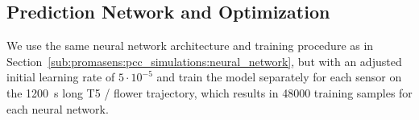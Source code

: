         


\subsection{Prediction Network and Optimization}\label{sub:promasens:experiments_neural_network}
We use the same neural network architecture and training procedure as in Section~\ref{sub:promasens:pcc_simulations:neural_network}, but with an adjusted initial learning rate of $5 \cdot 10^{-5}$ and train the model separately for each sensor on the \SI{1200}{s} long T5 / flower trajectory, which results in \SI{48000}{} training samples for each neural network.

